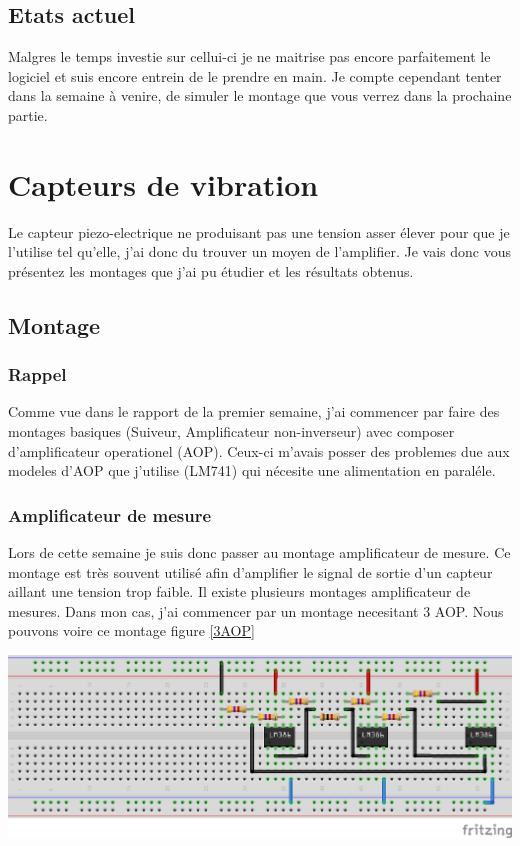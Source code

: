 \documentclass[11pt,french,a4paper]{article}
\begin{document}
\subsection{Etats actuel}
Malgres le temps investie sur cellui-ci je ne maitrise pas encore parfaitement le logiciel et suis encore entrein de le prendre en main. Je compte cependant tenter dans la semaine à venire, de simuler le montage que vous verrez dans la prochaine partie. 
\newpage
\section{Capteurs de vibration}
Le capteur piezo-electrique ne produisant pas une tension asser élever pour que je l’utilise tel qu’elle, j’ai donc du trouver un moyen de l’amplifier. Je vais donc vous présentez les montages que j’ai pu étudier et les résultats obtenus.

\subsection{Montage}
\subsubsection{Rappel}

Comme vue dans le rapport de la premier semaine, j’ai commencer par faire des montages basiques (Suiveur, Amplificateur non-inverseur) avec composer d’amplificateur operationel (AOP). Ceux-ci m’avais  posser des problemes due aux modeles d’AOP que j’utilise (LM741) qui nécesite une alimentation en paraléle.

\subsubsection{Amplificateur de mesure}

Lors de cette semaine je suis donc passer au montage amplificateur de mesure. Ce montage est très souvent utilisé afin d’amplifier le signal de sortie d’un capteur aillant une tension trop faible.
Il existe plusieurs montages amplificateur de mesures. Dans mon cas, j’ai commencer par un montage necesitant 3 AOP. Nous pouvons voire ce montage figure \ref{3AOP}

\begin{center}	
\includegraphics[scale=1]{../img/instrumentation3aop_bb.png}
\label{3AOP}
\end{center}
\end{document}
